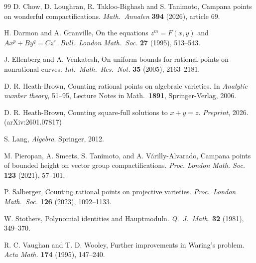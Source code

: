 \documentclass[a4paper,11pt,twoside,reqno]{amsart}
\theoremstyle{definition}
\theoremstyle{remark}
\numberwithin{equation}{section}
\newcommand\1{\mathbf{1}}
\begin{document}
\begin{thebibliography}{99}
D. Chow, D. Loughran, R. Takloo-Bighash and S. Tanimoto,
Campana points on wonderful compactifications.
{\em Math.\ Annalen} {\bf 394} (2026), article 69.

H. Darmon and A. Granville,
On the equations $z^m=F(x,y)$ and $Ax^p+By^q=Cz^r$.
{\em Bull.\ London Math.\ Soc.} {\bf 27} (1995), 513--543.

J. Ellenberg and A. Venkatesh,
On uniform bounds for rational points on nonrational curves.
{\em Int.\ Math.\ Res.\ Not.} {\bf 35} (2005), 2163--2181.

D. R. Heath-Brown,
Counting rational points on algebraic varieties.
In {\em Analytic number theory}, 51--95, Lecture Notes in Math.\
{\bf 1891}, Springer-Verlag, 2006.

D. R. Heath-Brown,
Counting square-full solutions to $x+y=z$.
{\em Preprint}, 2026. (arXiv:2601.07817)

S. Lang,
{\em Algebra}.
Springer, 2012.

M. Pieropan, A. Smeets, S. Tanimoto, and A. V\'arilly-Alvarado,
Campana points of bounded height on vector group compactifications. {\em Proc. London Math. Soc.} {\bf 123} (2021), 57--101. 

P. Salberger,
Counting rational points on projective varieties.
{\em Proc.\ London Math.\ Soc.} {\bf 126} (2023), 1092--1133.

W. Stothers,
Polynomial identities and Hauptmoduln.
{\em Q.\ J.\ Math.} {\bf 32} (1981), 349--370.

R. C. Vaughan and T. D. Wooley, Further improvements in Waring’s problem. {\em Acta Math.} {\bf 174} (1995), 147--240.

\end{thebibliography}
\end{document}
